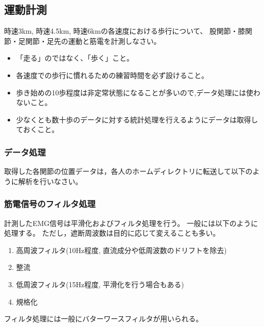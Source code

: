 \documentclass{jarticle}
\begin{document}
\subsection{運動計測}

時速3km, 時速4.5km, 時速6kmの各速度における歩行について、
股関節・膝関節・足関節・足先の運動と筋電を計測しなさい。
\begin{itemize}
\item 「走る」のではなく、「歩く」こと。
\item 各速度での歩行に慣れるための練習時間を必ず設けること。
\item 歩き始めの10歩程度は非定常状態になることが多いので,データ処理には使わないこと。
\item 少なくとも数十歩のデータに対する統計処理を行えるようにデータは取得しておくこと。
\end{itemize}

\subsubsection{データ処理}
取得した各関節の位置データは，各人のホームディレクトリに転送して以下のように解析を行いなさい。

\subsubsection{筋電信号のフィルタ処理}

計測したEMG信号は平滑化およびフィルタ処理を行う。
一般には以下のように処理する。
ただし，遮断周波数は目的に応じて変えることも多い。
\begin{enumerate}
  \item 高周波フィルタ(10Hz程度, 直流成分や低周波数のドリフトを除去)
  \item 整流
  \item 低周波フィルタ(15Hz程度, 平滑化を行う場合もある)
  \item 規格化
\end{enumerate}
フィルタ処理には一般にバターワースフィルタが用いられる。
\end{document}
